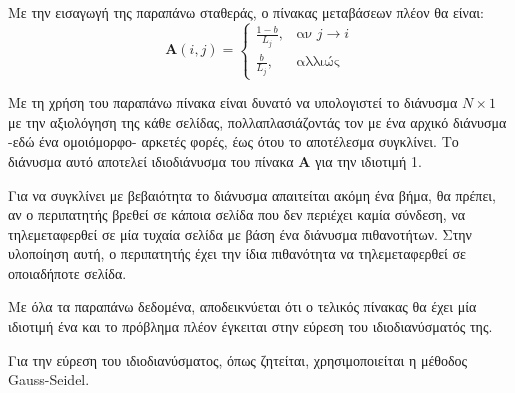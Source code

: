 Με την εισαγωγή της παραπάνω σταθεράς, ο πίνακας μεταβάσεων πλέον θα είναι:
\[
  \bm{A}(i, j) = 
  \begin{cases}
    \frac{1-b}{L_j}, & \text{αν } j\rightarrow i \\
    \frac{b}{L_j}, & \text{αλλιώς }
  \end{cases}
\]

Με τη χρήση του παραπάνω πίνακα είναι δυνατό να υπολογιστεί το διάνυσμα $N\times1$ με την αξιολόγηση της κάθε σελίδας, πολλαπλασιάζοντάς τον με ένα αρχικό διάνυσμα -εδώ ένα ομοιόμορφο- αρκετές φορές, έως ότου το αποτέλεσμα συγκλίνει. Το διάνυσμα αυτό αποτελεί ιδιοδιάνυσμα του πίνακα $\bm{A}$ για την ιδιοτιμή 1.

Για να συγκλίνει με βεβαιότητα το διάνυσμα απαιτείται ακόμη ένα βήμα, θα πρέπει, αν ο περιπατητής βρεθεί σε κάποια σελίδα που δεν περιέχει καμία σύνδεση, να τηλεμεταφερθεί σε μία τυχαία σελίδα με βάση ένα διάνυσμα πιθανοτήτων. Στην υλοποίηση αυτή, ο περιπατητής έχει την ίδια πιθανότητα να τηλεμεταφερθεί σε οποιαδήποτε σελίδα.

Με όλα τα παραπάνω δεδομένα, αποδεικνύεται ότι ο τελικός πίνακας θα έχει μία ιδιοτιμή ένα και το πρόβλημα πλέον έγκειται στην εύρεση του ιδιοδιανύσματός της.

Για την εύρεση του ιδιοδιανύσματος, όπως ζητείται, χρησιμοποιείται η μέθοδος Gauss-Seidel.

